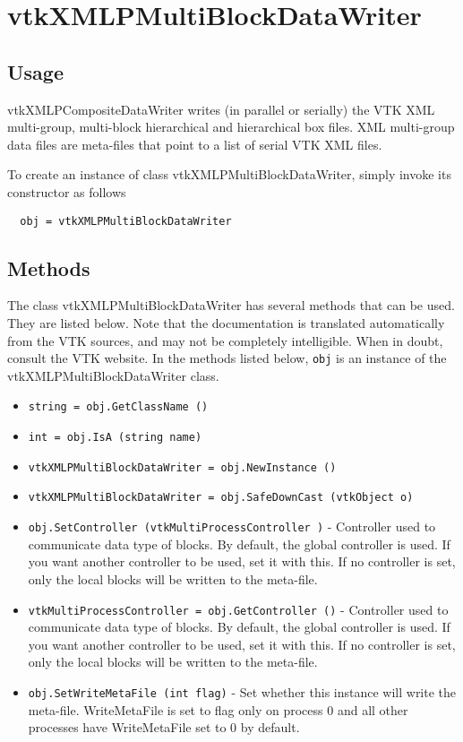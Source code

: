 \section{vtkXMLPMultiBlockDataWriter}

\subsection{Usage}

 vtkXMLPCompositeDataWriter writes (in parallel or serially) the VTK XML
 multi-group, multi-block hierarchical and hierarchical box files. XML
 multi-group data files are meta-files that point to a list of serial VTK
 XML files.

To create an instance of class vtkXMLPMultiBlockDataWriter, simply
invoke its constructor as follows
\begin{verbatim}
  obj = vtkXMLPMultiBlockDataWriter
\end{verbatim}
\subsection{Methods}

The class vtkXMLPMultiBlockDataWriter has several methods that can be used.
  They are listed below.
Note that the documentation is translated automatically from the VTK sources,
and may not be completely intelligible.  When in doubt, consult the VTK website.
In the methods listed below, \verb|obj| is an instance of the vtkXMLPMultiBlockDataWriter class.
\begin{itemize}
\item  \verb|string = obj.GetClassName ()|

\item  \verb|int = obj.IsA (string name)|

\item  \verb|vtkXMLPMultiBlockDataWriter = obj.NewInstance ()|

\item  \verb|vtkXMLPMultiBlockDataWriter = obj.SafeDownCast (vtkObject o)|

\item  \verb|obj.SetController (vtkMultiProcessController )| -  Controller used to communicate data type of blocks.
 By default, the global controller is used. If you want another
 controller to be used, set it with this.
 If no controller is set, only the local blocks will be written
 to the meta-file.

\item  \verb|vtkMultiProcessController = obj.GetController ()| -  Controller used to communicate data type of blocks.
 By default, the global controller is used. If you want another
 controller to be used, set it with this.
 If no controller is set, only the local blocks will be written
 to the meta-file.

\item  \verb|obj.SetWriteMetaFile (int flag)| -  Set whether this instance will write the meta-file. WriteMetaFile
 is set to flag only on process 0 and all other processes have
 WriteMetaFile set to 0 by default.

\end{itemize}
